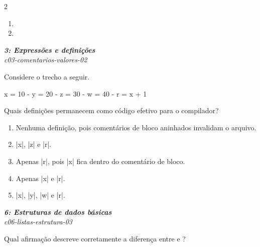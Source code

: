 \documentclass[a4paper,10pt,brazil]{article}
\begin{document}
\begin{multicols}{2}
\begin{enumerate}
  \item {}

  \item \haskellinline{([String], [Int], [Double])}


\end{enumerate}

\begin{flushright}
  \footnotesize
  \textit{\textbf{3: Expressões e definições}}\\
  \textit{c03-comentarios-valores-02}\\

\end{flushright}
Considere o trecho a seguir.

\begin{haskellcode}
x = 10
{-
y = 20
  {- z = 30 -}
w = 40
-}
r = x + 1
\end{haskellcode}

Quais definições permanecem como código efetivo para o compilador?

\begin{enumerate}
  \item Nenhuma definição, pois comentários de bloco aninhados invalidam o arquivo.

  \item \haskellinline|x|, \haskellinline|z| e \haskellinline|r|.

  \item Apenas \haskellinline|r|, pois \haskellinline|x| fica dentro do comentário de bloco.

  \item Apenas \haskellinline|x| e \haskellinline|r|.

  \item \haskellinline|x|, \haskellinline|y|, \haskellinline|w| e \haskellinline|r|.


\end{enumerate}

\begin{flushright}
  \footnotesize
  \textit{\textbf{6: Estruturas de dados básicas}}\\
  \textit{c06-listas-estrutura-03}\\

\end{flushright}
Qual afirmação descreve corretamente a diferença entre \haskellinline{(:)} e \haskellinline{(++)}?


\end{multicols}
\end{document}
